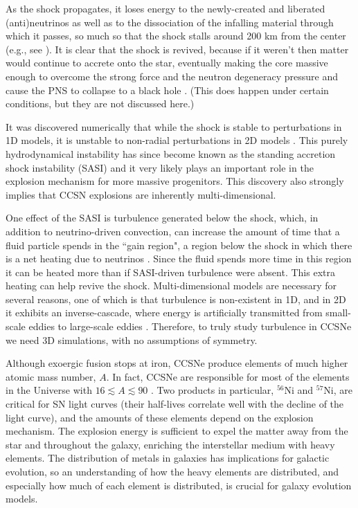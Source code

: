 As the shock propagates, it loses energy to the newly-created and liberated
(anti)neutrinos as well as to the dissociation of the
infalling material through which it passes,
so much so that the shock stalls around 200 km from the center
(e.g., see \citet{hm1981}).
It is clear that the shock is revived, because if it weren't then matter
would continue to accrete onto the star, eventually making the core massive
enough to overcome the strong force and the neutron degeneracy pressure
and cause the PNS to collapse
to a black hole \citep{bw1985}.
(This does happen under certain conditions, but they are not discussed here.)

It was discovered numerically that while the shock is stable to
perturbations in 1D models, it is unstable to non-radial perturbations
in 2D models \citep{bmd2003}.
This purely hydrodynamical instability has since become known as the
standing accretion shock instability (SASI) and it very likely plays an
important role in the explosion mechanism for more massive progenitors.
This discovery also strongly implies that CCSN explosions are
inherently multi-dimensional.

One effect of the SASI is turbulence generated below the shock,
which, in addition to neutrino-driven convection,
can increase the amount of time that a fluid particle spends
in the ``gain region", a region below the shock in which there is a
net heating due to neutrinos \citep{co2015}.
Since the fluid spends more time in this region it can be heated more than if
SASI-driven turbulence were absent.
This extra heating can help revive the shock.
Multi-dimensional models are necessary for several reasons,
one of which is that turbulence is non-existent in 1D, and in 2D it
exhibits an inverse-cascade, where energy is artificially transmitted
from small-scale eddies to large-scale eddies \citep{yem2017}.
Therefore, to truly study turbulence in CCSNe we need 3D simulations,
with no assumptions of symmetry.

Although exoergic fusion stops at iron,
CCSNe produce elements of much higher atomic mass number, $A$.
In fact, CCSNe are responsible for most of the elements in the Universe with
$16\lesssim A\lesssim90$ \citep{bw2017}.
Two products in particular, $^{56}$Ni and $^{57}$Ni, are critical for SN light
curves (their half-lives correlate well with the decline of the light curve),
and the amounts of these elements depend on the explosion mechanism.
The explosion energy is sufficient to expel the matter away from the star
and throughout the galaxy, enriching the interstellar medium with heavy
elements.
The distribution of metals in galaxies has implications for galactic
evolution, so an understanding of how the heavy elements are distributed,
and especially how much of each element is distributed,
is crucial for galaxy evolution models.

